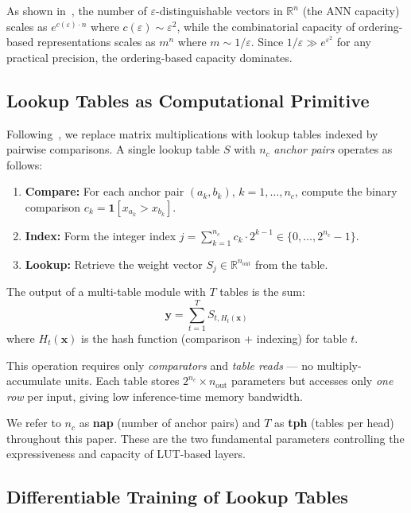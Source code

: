 \documentclass[11pt]{article}
\begin{document}
As shown in~\cite{ref:manifesto}, the number of $\varepsilon$-distinguishable vectors in $\mathbb{R}^n$ (the ANN capacity) scales as $e^{c(\varepsilon) \cdot n}$ where $c(\varepsilon) \sim \varepsilon^2$, while the combinatorial capacity of ordering-based representations scales as $m^n$ where $m \sim 1/\varepsilon$.
Since $1/\varepsilon \gg e^{\varepsilon^2}$ for any practical precision, the ordering-based capacity dominates.


\subsection{Lookup Tables as Computational Primitive}

Following~\cite{ref:manifesto}, we replace matrix multiplications with lookup tables indexed by pairwise comparisons.
A single lookup table $S$ with $n_c$ \emph{anchor pairs} operates as follows:

\begin{enumerate}
    \item \textbf{Compare:} For each anchor pair $(a_k, b_k)$, $k = 1, \ldots, n_c$, compute the binary comparison $c_k = \mathbf{1}[x_{a_k} > x_{b_k}]$.
    \item \textbf{Index:} Form the integer index $j = \sum_{k=1}^{n_c} c_k \cdot 2^{k-1} \in \{0, \ldots, 2^{n_c} - 1\}$.
    \item \textbf{Lookup:} Retrieve the weight vector $S_j \in \mathbb{R}^{n_\mathrm{out}}$ from the table.
\end{enumerate}

The output of a multi-table module with $T$ tables is the sum:
\begin{equation}
    \mathbf{y} = \sum_{t=1}^{T} S_{t, H_t(\mathbf{x})}
    \label{eq:lut}
\end{equation}
where $H_t(\mathbf{x})$ is the hash function (comparison + indexing) for table $t$.

This operation requires only \emph{comparators} and \emph{table reads} --- no multiply-accumulate units.
Each table stores $2^{n_c} \times n_\mathrm{out}$ parameters but accesses only \emph{one row} per input, giving low inference-time memory bandwidth.

We refer to $n_c$ as \textbf{nap} (number of anchor pairs) and $T$ as \textbf{tph} (tables per head) throughout this paper.
These are the two fundamental parameters controlling the expressiveness and capacity of LUT-based layers.


\subsection{Differentiable Training of Lookup Tables}
\label{sec:surrogate}
\end{document}

